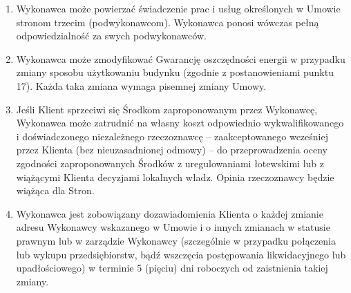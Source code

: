 \begin{multicols}{2}
\begin{enumerate}
	\item Wykonawca może powierzać świadczenie prac i usług określonych w Umowie stronom trzecim (podwykonawcom). Wykonawca ponosi wówczas pełną odpowiedzialność za swych podwykonawców.
	\item Wykonawca może zmodyfikować Gwarancję oszczędności energii w przypadku zmiany sposobu użytkowaniu budynku (zgodnie z postanowieniami punktu 17). Każda taka zmiana wymaga pisemnej zmiany Umowy.
	\item Jeśli Klient sprzeciwi się Środkom zaproponowanym przez Wykonawcę, Wykonawca może zatrudnić na własny koszt odpowiednio wykwalifikowanego i doświadczonego niezależnego rzeczoznawcę – zaakceptowanego wcześniej przez Klienta (bez nieuzasadnionej odmowy) – do przeprowadzenia oceny zgodności zaproponowanych Środków z uregulowaniami łotewskimi lub z wiążącymi Klienta decyzjami lokalnych władz. Opinia rzeczoznawcy będzie wiążąca dla Stron.
	\item Wykonawca jest zobowiązany dozawiadomienia Klienta o każdej zmianie adresu Wykonawcy wskazanego w Umowie i o innych zmianach w statusie prawnym lub w zarządzie Wykonawcy (szczególnie w przypadku połączenia lub wykupu przedsiębiorstw, bądź wszczęcia postępowania likwidacyjnego lub upadłościowego) w terminie 5 (pięciu) dni roboczych od zaistnienia takiej zmiany.
\end{enumerate}


\end{multicols}
